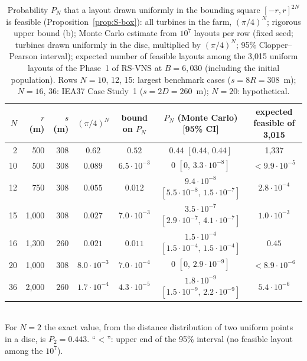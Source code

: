 \begin{table}[!htbp]
\centering
\caption{Probability $P_N$ that a layout drawn uniformly in the bounding square $[-r,r]^{2N}$ is feasible (Proposition~\ref{prop:S-box}): all turbines in the farm, $(\pi/4)^N$; rigorous upper bound (b); Monte Carlo estimate from $10^7$ layouts per row (fixed seed; turbines drawn uniformly in the disc, multiplied by $(\pi/4)^N$; 95\% Clopper--Pearson interval); expected number of feasible layouts among the 3{,}015 uniform layouts of the Phase~1 of RS-VNS at $B=6{,}030$ (including the initial population). Rows $N=10$, 12, 15: largest benchmark cases ($s=8R=308$~m); $N=16$, 36: IEA37 Case Study~1 ($s=2D=260$~m); $N=20$: hypothetical.}
\label{tab:S-th-box}
\small\setlength{\tabcolsep}{4pt}
\begin{tabular}{rrrcccc}
\toprule
$N$ & $r$ (m) & $s$ (m) & $(\pi/4)^N$ & bound on $P_N$ & $P_N$ (Monte Carlo) [95\% CI] & expected feasible of 3{,}015\\
\midrule
2 & 500 & 308 & $0.62$ & $0.52$ & $0.44$ $[0.44,\,0.44]$ & 1{,}337 \\
10 & 500 & 308 & $0.089$ & $6.5\cdot10^{-3}$ & $0$ $[0,\,3.3\cdot10^{-8}]$ & $<9.9\cdot10^{-5}$ \\
12 & 750 & 308 & $0.055$ & $0.012$ & $9.4\cdot10^{-8}$ $[5.5\cdot10^{-8},\,1.5\cdot10^{-7}]$ & $2.8\cdot10^{-4}$ \\
15 & 1{,}000 & 308 & $0.027$ & $7.0\cdot10^{-3}$ & $3.5\cdot10^{-7}$ $[2.9\cdot10^{-7},\,4.1\cdot10^{-7}]$ & $1.0\cdot10^{-3}$ \\
16 & 1{,}300 & 260 & $0.021$ & $0.011$ & $1.5\cdot10^{-4}$ $[1.5\cdot10^{-4},\,1.5\cdot10^{-4}]$ & $0.45$ \\
20 & 1{,}000 & 308 & $8.0\cdot10^{-3}$ & $7.0\cdot10^{-4}$ & $0$ $[0,\,2.9\cdot10^{-9}]$ & $<8.9\cdot10^{-6}$ \\
36 & 2{,}000 & 260 & $1.7\cdot10^{-4}$ & $4.3\cdot10^{-5}$ & $1.8\cdot10^{-9}$ $[1.5\cdot10^{-9},\,2.2\cdot10^{-9}]$ & $5.4\cdot10^{-6}$ \\
\bottomrule
\end{tabular}
\\[2pt]{\footnotesize For $N=2$ the exact value, from the distance distribution of two uniform points in a disc, is $P_2=0.443$. ``$<$'': upper end of the 95\% interval (no feasible layout among the $10^7$).}
\end{table}

